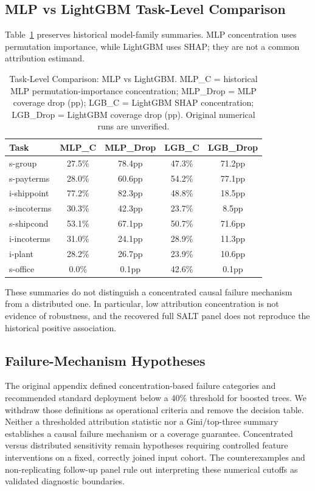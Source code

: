 \documentclass[accepted]{uai2026} %
\begin{document}
\subsection{MLP vs LightGBM Task-Level Comparison}\label{app:mlp_lgb_comparison}

Table~\ref{tab:mlp_lgb_comparison} preserves historical model-family summaries. MLP concentration uses permutation importance, while LightGBM uses SHAP; they are not a common attribution estimand.

\begin{table}[htbp]
\centering
\caption{Task-Level Comparison: MLP vs LightGBM. MLP\_C = historical MLP permutation-importance concentration; MLP\_Drop = MLP coverage drop (pp); LGB\_C = LightGBM SHAP concentration; LGB\_Drop = LightGBM coverage drop (pp). Original numerical runs are unverified.}\label{tab:mlp_lgb_comparison}
\small
\begin{tabular}{@{}lcccc@{}}
\toprule
Task & MLP\_C & MLP\_Drop & LGB\_C & LGB\_Drop \\
\midrule
s-group & 27.5\% & 78.4pp & 47.3\% & 71.2pp \\
s-payterms & 28.0\% & 60.6pp & 54.2\% & 77.1pp \\
i-shippoint & 77.2\% & 82.3pp & 48.8\% & 18.5pp \\
s-incoterms & 30.3\% & 42.3pp & 23.7\% & 8.5pp \\
s-shipcond & 53.1\% & 67.1pp & 50.7\% & 71.6pp \\
i-incoterms & 31.0\% & 24.1pp & 28.9\% & 11.3pp \\
i-plant & 28.2\% & 26.7pp & 23.9\% & 10.6pp \\
s-office & 0.0\% & 0.1pp & 42.6\% & 0.1pp \\
\bottomrule
\end{tabular}


\raggedright
\footnotesize
These summaries do not distinguish a concentrated causal failure mechanism from a distributed one. In particular, low attribution concentration is not evidence of robustness, and the recovered full SALT panel does not reproduce the historical positive association.
\end{table}

\subsection{Failure-Mechanism Hypotheses}\label{app:failure_modes}

The original appendix defined concentration-based failure categories and recommended standard deployment below a 40\% threshold for boosted trees. We withdraw those definitions as operational criteria and remove the decision table. Neither a thresholded attribution statistic nor a Gini/top-three summary establishes a causal failure mechanism or a coverage guarantee. Concentrated versus distributed sensitivity remain hypotheses requiring controlled feature interventions on a fixed, correctly joined input cohort. The counterexamples and non-replicating follow-up panel rule out interpreting these numerical cutoffs as validated diagnostic boundaries.
\end{document}
